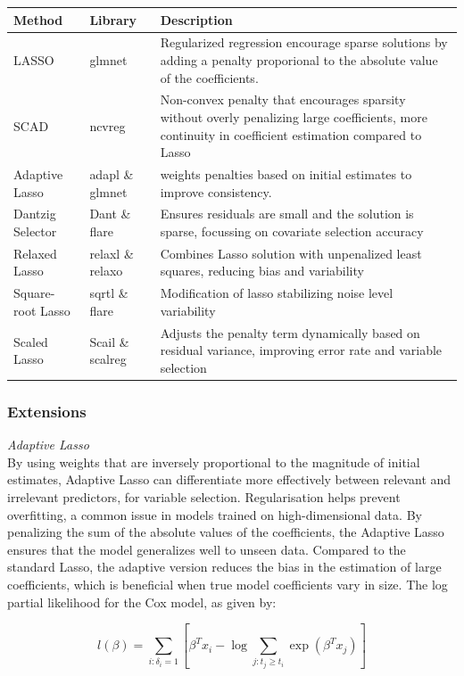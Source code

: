 \begin{tabularx}{\textwidth}{|X|X|X|}
	\hline
	Method & Library & Description \\
	\hline
	LASSO & glmnet & Regularized regression encourage sparse solutions by adding a penalty proporional to the absolute value of the coefficients. \\
	\hline
	SCAD & ncvreg & Non-convex penalty that encourages sparsity without overly penalizing large coefficients, more continuity in coefficient estimation compared to Lasso \\
	\hline
	Adaptive Lasso & adapl \& glmnet & weights penalties based on initial estimates to improve consistency. \\
	\hline
	Dantzig Selector & Dant \& flare & Ensures residuals are small and the solution is sparse, focussing on covariate selection accuracy \\
	\hline
	Relaxed Lasso & relaxl \& relaxo & Combines Lasso solution with unpenalized least squares, reducing bias and variability  \\
	\hline
	Square-root Lasso & sqrtl \& flare & Modification of lasso stabilizing noise level variability \\
	\hline
	Scaled Lasso & Scail \& scalreg & Adjusts the penalty term dynamically based on residual variance, improving error rate and variable selection \\
	\hline
\end{tabularx}
\subsubsection{Extensions}

\noindent \textit{Adaptive Lasso}
\\
\noindent By using weights that are inversely proportional to the magnitude of initial estimates, \parencite{zhang_adaptive_2007} Adaptive Lasso can differentiate more effectively between relevant and irrelevant predictors, for variable selection. Regularisation helps prevent overfitting, a common issue in models trained on high-dimensional data. \parencite{zhang_adaptive_2007} By penalizing the sum of the absolute values of the coefficients, the Adaptive Lasso ensures that the model generalizes well to unseen data. Compared to the standard Lasso, the adaptive version reduces the bias in the estimation of large coefficients, which is beneficial when true model coefficients vary in size. The log partial likelihood for the Cox model, as given by:

\begin{equation} \label{eq:likelihood}l(\beta) = \sum_{i:\delta_{i}=1} \left[ \beta^{T}x_{i} - \log{\sum_{j:t_{j}\ge t_{i}} \exp(\beta^{T}x_{j})} \right]\end{equation}

